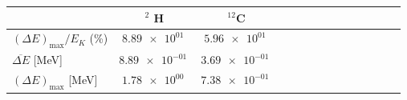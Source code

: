 \begin{tabular}{lccccccccccccc}
\toprule
 & $^2$ H & $^{12}$C \\
\midrule
$(\Delta E)_{\max}/E_K$ (\%) & $\SI{8.89e+01}{}$ & $\SI{5.96e+01}{}$ \\
$\overline{\Delta E}$ [MeV] & $\SI{8.89e-01}{}$ & $\SI{3.69e-01}{}$ \\
$(\Delta E)_{\max}$ [MeV] & $\SI{1.78e+00}{}$ & $\SI{7.38e-01}{}$ \\
\bottomrule
\end{tabular}
